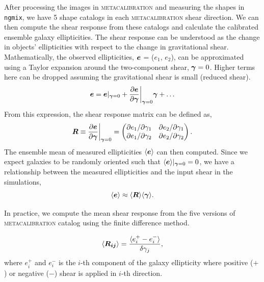 \documentclass[fleqn,usenatbib]{mnras}
\begin{document}
After processing the images in \textsc{metacalibration} and measuring the shapes in \texttt{ngmix}, we have 5 shape catalogs in each \textsc{metacalibration} shear direction. We can then compute the shear response from these catalogs and calculate the calibrated ensemble galaxy ellipticities. The shear response can be understood as the change in objects' ellipticities with respect to the change in gravitational shear. Mathematically, the observed ellipticities, $\vb*{e}$ = ($e_{1}$, $e_{2}$), can be approximated using a Taylor expansion around the two-component shear, $\vb*{\gamma}=0$. Higher terms here can be dropped assuming the gravitational shear is small (reduced shear). 
\begin{equation}
    \vb*{e} = \vb*{e}\rvert_{\vb*{\gamma}=0} + \frac{\partial \vb*{e}}{\partial \vb*{\gamma}}\bigg\rvert_{\vb*{\gamma}=0}\vb*{\gamma} + \ldots
\end{equation}
From this expression, the shear response matrix can be defined as, 
\begin{equation}
    \vb*{R} \equiv \frac{\partial \vb*{e}}{\partial \vb*{\gamma}}\bigg\rvert_{\vb*{\gamma}=0} = 
    \begin{pmatrix}
        \partial e_{1}/\partial \gamma_{1} & \partial e_{2}/\partial \gamma_{1} \\ 
        \partial e_{1}/\partial \gamma_{2} & \partial e_{2}/\partial \gamma_{2}
    \end{pmatrix}. 
\end{equation}
The ensemble mean of measured ellipticities $\langle\vb*{e}\rangle$ can then computed. Since we expect galaxies to be randomly oriented such that $\langle\vb*{e}\rangle\rvert_{\vb*{\gamma}=0}=0$, we have a relationship between the measured ellipticities and the input shear in the simulations, 
\begin{equation}
    \langle\vb*{e}\rangle \approx \langle \vb*{R}\rangle\langle\vb*{\gamma} \rangle. 
\end{equation} 


In practice, we compute the mean shear response from the five versions of \textsc{metacalibration} catalog using the finite difference method. 

\begin{equation}
    \langle\vb*{R_{ij}}\rangle = 
    \frac{\langle e^{+}_{i} - e^{-}_{i} \rangle}{\delta\gamma_{j}}, 
\end{equation}
where $e^{+}_{i}$ and $e^{-}_{i}$ is the $i$-th component of the galaxy ellipticity where positive ($+$) or negative ($-$) shear is applied in $i$-th direction. 
\end{document}
